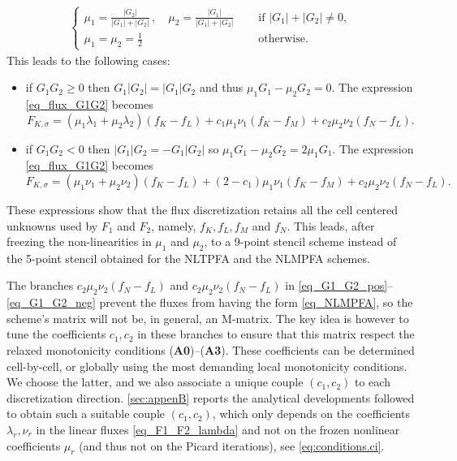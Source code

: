 \documentclass[final,11pt]{elsarticle}
\begin{document}
\begin{equation*}
    \begin{gathered}
    \left\{\begin{array}{ll}
    \displaystyle\mu_1=\frac{|G_2|}{|G_1|+|G_2|}\,,\quad\mu_2=\frac{|G_1|}{|G_1|+|G_2|}&\quad\text{ if }|G_1|+|G_2|\neq 0,\\
    \mu_1=\mu_2=\frac12&\quad\mbox{ otherwise}.
    \end{array}\right.
    \end{gathered}
\end{equation*}
This leads to the following cases:
\begin{itemize}
\item if $G_1G_2\geq 0$ then $G_1|G_2|=|G_1|G_2$ and thus $\mu_1G_1-\mu_2G_2=0$. The expression \eqref{eq_flux_G1G2} becomes
    \begin{equation}
    F_{K,\sigma}=(\mu_1\lambda_1+\mu_2\lambda_2)(f_K-f_L)
    +c_1\mu_1\nu_1(f_K-f_{M})+c_2\mu_2\nu_2(f_N-f_L).
    \label{eq_G1_G2_pos}
    \end{equation}
\item if $G_1G_2 <0$ then $|G_1|G_2=-G_1|G_2|$ so $\mu_1G_1- \mu_2G_2=2\mu_1G_1$. The expression \eqref{eq_flux_G1G2} becomes
\begin{equation}
    F_{K,\sigma}=(\mu_1\nu_1+\mu_2\nu_2)(f_K-f_L)
    +(2-c_1)\mu_1\nu_1(f_K-f_{M})+c_2\mu_2\nu_2(f_N-f_L).
    \label{eq_G1_G2_neg}
\end{equation}
\end{itemize}

These expressions show that the flux discretization retains all the cell centered unknowns used by $F_1$ and $F_2$, namely, $f_K,f_L,f_M$ and $f_N$. This leads, after freezing the non-linearities in $\mu_1$ and $\mu_2$, to a 9-point stencil scheme instead of the 5-point stencil obtained for the NLTPFA and the NLMPFA schemes.

The branches $c_2\mu_2\nu_2(f_N-f_L)$ and $c_2\mu_2\nu_2(f_N-f_L)$ in \eqref{eq_G1_G2_pos}--\eqref{eq_G1_G2_neg} prevent the fluxes from having the form \eqref{eq_NLMPFA}, so the scheme's matrix will not be, in general, an M-matrix. The key idea is however to tune the coefficients $c_1,c_2$ in these branches to ensure that this matrix respect the relaxed monotonicity conditions (\textbf{A0})--(\textbf{A3}). These coefficients can be determined cell-by-cell, or globally using the most demanding local monotonicity conditions. We choose the latter, and we also associate a unique couple $(c_1,c_2)$ to each discretization direction. \ref{sec:appenB} reports the analytical developments followed to obtain such a suitable couple $(c_1,c_2)$, which only depends on the coefficients $\lambda_r,\nu_r$ in the linear fluxes \eqref{eq_F1_F2_lambda} and not on the frozen nonlinear coefficients $\mu_r$ (and thus not on the Picard iterations), see \eqref{eq:conditions.ci}.
\end{document}
